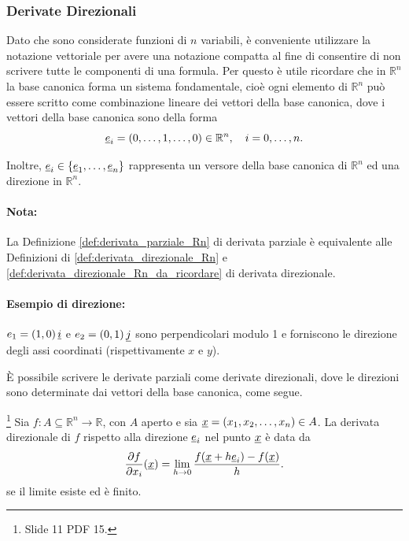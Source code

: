 \subsubsection{Derivate Direzionali} 
Dato che sono considerate funzioni di $n$ variabili, è conveniente utilizzare la notazione vettoriale per avere una notazione compatta al fine di consentire di non scrivere tutte le componenti di una formula. Per questo è utile ricordare che in $\mathbb{R}^n$ la base canonica forma un sistema fondamentale, cioè ogni elemento di $\mathbb{R}^n$ può essere scritto come combinazione lineare dei vettori della base canonica, dove i vettori della base canonica sono della forma
\begin{equation*}
	\uline e_i=(0,\hdots, 1,\hdots, 0)\in\mathbb{R}^n,\quad i=0,\hdots,n.
\end{equation*}

\noindent Inoltre, $\uline e_i\in\{\uline e_1,\hdots, \uline e_n\}$ rappresenta un versore della base canonica di $\mathbb{R}^n$ ed una direzione in $\mathbb{R}^n$.

\paragraph{Nota:} La Definizione \ref{def:derivata_parziale_Rn} di derivata parziale è equivalente alle Definizioni di \ref{def:derivata_direzionale_Rn} e \ref{def:derivata_direzionale_Rn_da_ricordare} di derivata direzionale.

\paragraph{Esempio di direzione:} $e_1=(1,0)\,\uline i$ e $e_2=(0,1)\, \uline j$ sono perpendicolari modulo 1 e forniscono le direzione degli assi coordinati (rispettivamente $x$ e $y$).

È possibile scrivere le derivate parziali come derivate direzionali, dove le direzioni sono determinate dai vettori della base canonica, come segue.

\begin{definition}\label{def:derivata_direzionale_Rn}\footnote{Slide 11 PDF 15.}
	Sia $f:A\subseteq\mathbb R^n\rightarrow\mathbb R$, con $A$ aperto e sia $\uline x=(x_1,x_2,\hdots, x_n)\in A$. La derivata direzionale di $f$ rispetto alla direzione $\uline e_i$ nel punto $\uline x$ è data da
	\begin{equation}\label{eq:derivata_direzionale_Rn}
		\frac{\partial f}{\partial x_i}(\uline x)=\lim\limits_{h\rightarrow 0}\frac{f(\uline x + h \uline e_i)-f(\uline x)}{h}.
	\end{equation}
	se il limite esiste ed è finito.
\end{definition}

